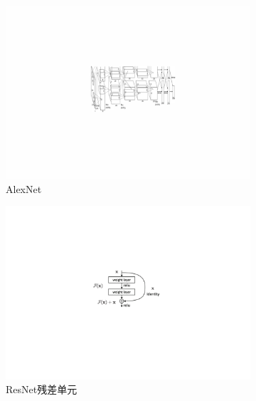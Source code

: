 \begin{figure}[h!] %
	\centering
	\begin{subfigure}{0.35\textwidth}
		\centering
		\includegraphics[width=1.0\textwidth]{figure/popular_networks_alex_net}
		\caption{AlexNet~\cite{krizhevsky2012imagenet}}
		\label{subfig1}
	\end{subfigure}
	\quad
	\begin{subfigure}{0.336\textwidth}
		\centering
		\includegraphics[width=1.0\textwidth]{figure/popular_networks_resnet}
		\caption{ResNet残差单元~\cite{he2016deep}}
		\label{subfig:resnet_block}
	\end{subfigure}
	\begin{subfigure}{0.265\textwidth}
		\centering

\end{subfigure}
\end{figure}
